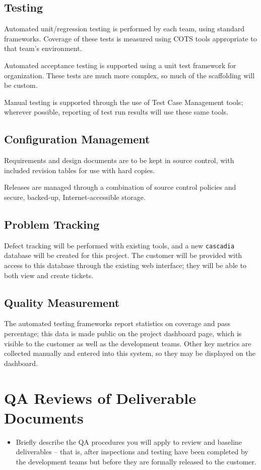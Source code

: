 \documentclass[11pt]{wacomepd}
\begin{document}
\section{Testing}
Automated unit/regression testing is performed by each team, using standard frameworks.  Coverage of
these tests is measured using COTS tools appropriate to that team's environment.

Automated acceptance testing is supported using a unit test framework for organization.  These tests
are much more complex, so much of the scaffolding will be custom.

Manual testing is supported through the use of Test Case Management tools; wherever possible,
reporting of test run results will use these same tools.

\section{Configuration Management}
Requirements and design documents are to be kept in source control, with included revision tables
for use with hard copies.

Releases are managed through a combination of source control policies and secure, backed-up,
Internet-accessible storage.

\section{Problem Tracking}
Defect tracking will be performed with existing tools, and a new {\tt cascadia} database will be
created for this project.  The customer will be provided with access to this database through the
existing web interface; they will be able to both view and create tickets.


\section{Quality Measurement}
The automated testing frameworks report statistics on coverage and pass percentage; this data is
made public on the project dashboard page, which is visible to the customer as well as the
development teams. Other key metrics are collected manually and entered into this system, so they
may be displayed on the dashboard.


\chapter{QA Reviews of Deliverable Documents}
\begin{itemize}
\item Briefly describe the QA procedures you will apply to review and baseline deliverables – that
  is, after inspections and testing have been completed by the development teams but before they are
  formally released to the customer.
\end{itemize}
\end{document}
